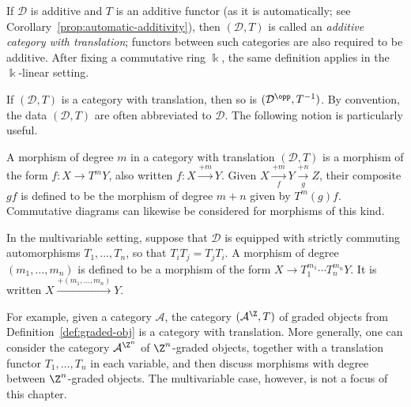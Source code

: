 \begin{definition}
	If $\mathcal{D}$ is additive and $T$ is an additive functor (as it is
	automatically; see Corollary~\ref{prop:automatic-additivity}), then
	$(\mathcal{D},T)$ is called an \emph{additive category with translation};
	functors between such categories are also required to be additive. After
	fixing a commutative ring $\Bbbk$, the same definition applies in the
	$\Bbbk$-linear setting.
\end{definition}

If $(\mathcal{D},T)$ is a category with translation, then so is
$(\mathcal{D}^{\opp},T^{-1})$. By convention, the data
$(\mathcal{D},T)$ are often abbreviated to $\mathcal{D}$. The following
notion is particularly useful.

\begin{definition}\label{def:morphism-with-degree}
	A morphism of degree $m$ in a category with translation
	$(\mathcal{D},T)$ is a morphism of the form $f:X\to T^mY$, also written
	$f:X\xrightarrow{+m}Y$. Given
	$X\xrightarrow[f]{+m}Y\xrightarrow[g]{+n}Z$, their composite $gf$ is
	defined to be the morphism of degree $m+n$ given by $T^m(g)f$.
	Commutative diagrams can likewise be considered for morphisms of this
	kind.

	In the multivariable setting, suppose that $\mathcal{D}$ is equipped with
	strictly commuting automorphisms $T_1,\ldots,T_n$, so that
	$T_iT_j=T_jT_i$. A morphism of degree $(m_1,\ldots,m_n)$ is defined to be
	a morphism of the form $X\to T_1^{m_1}\cdots T_n^{m_n}Y$. It is written
	$X\xrightarrow{+(m_1,\ldots,m_n)}Y$.
\end{definition}

For example, given a category $\mathcal{A}$, the category
$(\mathcal{A}^{\Z},T)$ of graded objects from
Definition~\ref{def:graded-obj} is a category with translation. More
generally, one can consider the category $\mathcal{A}^{\Z^n}$ of
$\Z^n$-graded objects, together with a translation functor
$T_1,\ldots,T_n$ in each variable, and then discuss morphisms with degree
between $\Z^n$-graded objects. The multivariable case, however, is not a
focus of this chapter.

